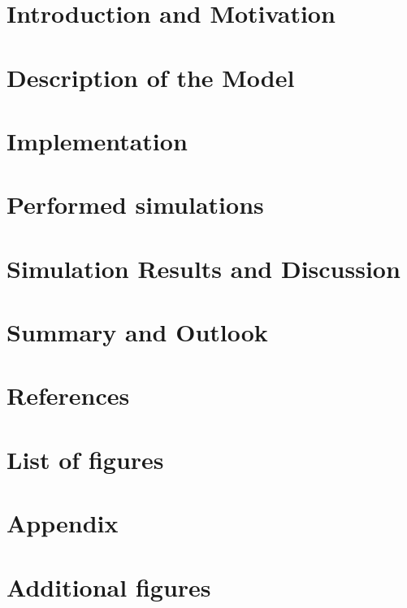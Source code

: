\documentclass[11pt]{article}
\begin{document}
\section{Introduction and Motivation}

\newpage

\section{Description of the Model}

\newpage

\section{Implementation}

\newpage

\section{Performed simulations}

\newpage

\section{Simulation Results and Discussion}

\newpage

\section{Summary and Outlook}

\newpage

\section{References}


\newpage
\section{List of figures}
\listoffigures

\newpage


\newpage
\begin{appendix}
\section*{Appendix}

\clearpage
\section{Additional figures}

\clearpage

\end{appendix}



\end{document}
